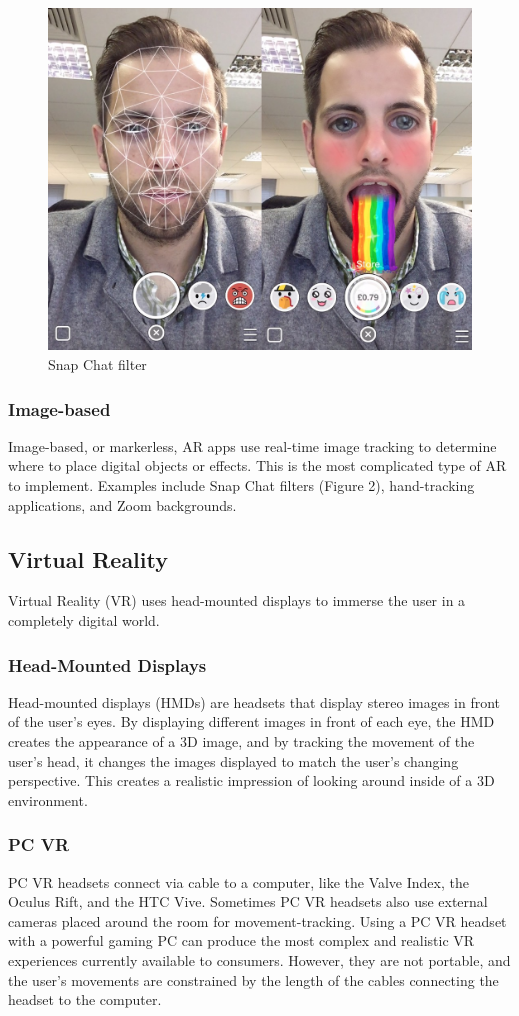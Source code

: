 \documentclass{article}
\begin{document}
\begin{figure}
\centering
\includegraphics[width=.55\textwidth]{snap}
\caption{Snap Chat filter}
\end{figure}

\subsubsection{Image-based} Image-based, or markerless, AR apps use real-time image tracking to determine where to place digital objects or effects. This is the most complicated type of AR to implement. Examples include Snap Chat filters (Figure 2), hand-tracking applications, and Zoom backgrounds.

\subsection{Virtual Reality}

Virtual Reality (VR) uses head-mounted displays to immerse the user in a completely digital world.

\subsubsection{Head-Mounted Displays} Head-mounted displays (HMDs) are headsets that display stereo images in front of the user's eyes. By displaying different images in front of each eye, the HMD creates the appearance of a 3D image, and by tracking the movement of the user's head, it changes the images displayed to match the user's changing perspective. This creates a realistic impression of looking around inside of a 3D environment.

\subsubsection{PC VR} PC VR headsets connect via cable to a computer, like the Valve Index, the Oculus Rift, and the HTC Vive. Sometimes PC VR headsets also use external cameras placed around the room for movement-tracking. Using a PC VR headset with a powerful gaming PC can produce the most complex and realistic VR experiences currently available to consumers. However, they are not portable, and the user's movements are constrained by the length of the cables connecting the headset to the computer.
\end{document}
